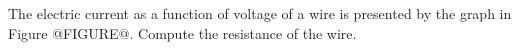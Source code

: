 The electric current as a function of voltage of a wire is presented 
by the graph in Figure @FIGURE@.
Compute the resistance of the wire.